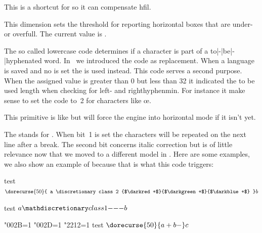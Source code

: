 \stopoldprimitive

\startoldprimitive[title={\prm {hfilneg}}]

This is a shortcut for  so it can compensate \prm
{hfil}.

\stopoldprimitive

\startoldprimitive[title={\prm {hfuzz}}]

This dimension sets the threshold for reporting horizontal boxes that are under-
or overfull. The current value is \the \hfuzz.

\stopoldprimitive

\startnewprimitive[title={\prm {hjcode}}]

The so called lowercase code determines if a character is part of a
to|-|be|-|hyphenated word. In \LUATEX\ we introduced the  code as replacement. When a language is saved and no 
is set the  is used instead. This code serves a second purpose. When
the assigned value is greater than 0 but less than 32 it indicated the to be used
length when checking for left- and righthyphenmin. For instance it make sense to
set the code to~2 for characters like œ.

\stopnewprimitive

\startoldprimitive[title={\prm {hkern}}]

This primitive is like  but will force the engine into horizontal mode
if it isn't yet.

\stopoldprimitive

\startnewprimitive[title={\prm {hmcode}}]

The  stands for . When bit~1 is set the
characters will be repeated on the next line after a break. The second bit
concerns italic correction but is of little relevance now that we moved to a
different model in \CONTEXT. Here are some examples, we also show an example of
 because that is what this code triggers:

\startbuffer
test $ \dorecurse {50} {
    a \discretionary class 2 {$\darkred +$}{$\darkgreen +$}{$\darkblue +$}
} b$

test $ a \mathdiscretionary class 1 {-}{-}{-} b$

\bgroup
    \hmcode"002B=1 %
    \hmcode"002D=1 %
    \hmcode"2212=1 %
    test $ \dorecurse{50}{a + b - } c$
\egroup
\stopbuffer

\typebuffer

{\getbuffer}


